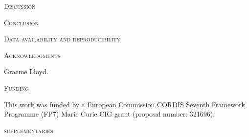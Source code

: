 \documentclass[12pt,letterpaper]{article}
\renewcommand{\section}[1]{%
\bigskip
\begin{center}
\begin{Large}
\normalfont\scshape #1
\medskip
\end{Large}
\end{center}}
\begin{document}
%
%

\section{Discussion}
%
%

\section{Conclusion}



\section{Data availability and reproducibility}

\section{Acknowledgments}
Graeme Lloyd. 

\section{Funding}
This work was funded by a European Commission CORDIS Seventh Framework Programme (FP7) Marie Curie CIG grant (proposal number: 321696).




\section{supplementaries}
\end{document}
